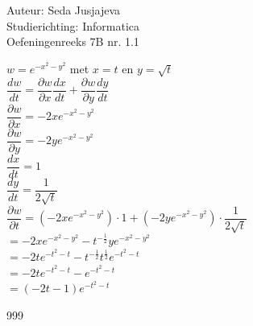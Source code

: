 \documentclass[a4paper]{article}
\begin{document}
\noindent \large Auteur: Seda Jusjajeva\\
\noindent \large Studierichting: Informatica\\
\noindent \large Oefeningenreeks 7B nr. 1.1\\

\medskip

\normalsize

$w = e^{-x^2 - y^2}$ met $x = t$ en $y = \sqrt{t}$ \\

$\dfrac{dw}{dt} = \dfrac{\partial w}{\partial x} \dfrac{dx}{dt} + \dfrac{\partial w}{\partial y} \dfrac{dy}{dt}$ \\

$\dfrac{\partial w}{\partial x} = -2xe^{-x^2 - y^2}$ \\

$\dfrac{\partial w}{\partial y} = -2ye^{-x^2 - y^2}$ \\

$\dfrac{dx}{dt} = 1$ \\

$\dfrac{dy}{dt} = \dfrac{1}{2\sqrt{t}}$ \\

$\dfrac{\partial w}{\partial t} = \left(-2xe^{-x^2 - y^2}\right) \cdot 1 + \left(-2y e^{-x^2 - y^2}\right) \cdot \dfrac{1}{2\sqrt{t}}$ \\

$= -2x e^{-x^2 - y^2} - t^{-\tfrac{1}{2}}ye^{-x^2 - y^2}$ \\

$= -2t e^{-t^2-t} - t^{-\tfrac{1}{2}}t^{\tfrac{1}{2}}e^{-t^2-t}$ \\

$= -2t e^{-t^2-t} - e^{-t^2-t}$ \\

$ = (-2t - 1)e^{-t^2-t}$ \\



\begin{thebibliography}{999}
\end{thebibliography}
\end{document}

